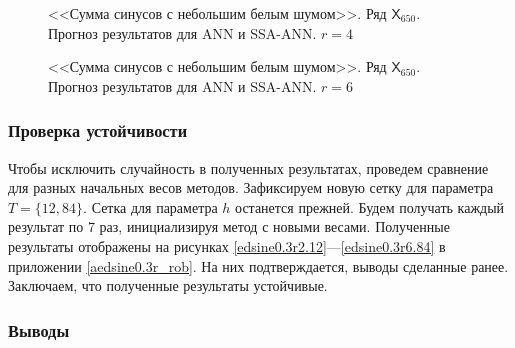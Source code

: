 \documentclass[specialist,
               substylefile = spbu.rtx,
               subf,href,colorlinks=true, 12p]{disser}
\newcommand{\multiref}[2]{\ref{#1}---\ref{#2}}
\begin{document}
\begin{figure}[H]
	\captionsetup{justification=centering}
	\caption{<<Сумма синусов с небольшим белым шумом>>. Ряд $\mathsf{X}_{650}$. Прогноз результатов для ANN и SSA-ANN. $r = 4$}
	\label{edsin0.3r_r4_res_ann}
\end{figure}

\begin{figure}[H]
	\captionsetup{justification=centering}
	\caption{<<Сумма синусов с небольшим белым шумом>>. Ряд $\mathsf{X}_{650}$. Прогноз результатов для ANN и SSA-ANN. $r = 6$}
	\label{edsin0.3r_r6_res_ann}
\end{figure}

\subsubsection{Проверка устойчивости}
\label{edsine0.3r_rob}
Чтобы исключить случайность в полученных результатах, проведем сравнение для разных начальных весов методов. Зафиксируем новую сетку для параметра $T = \{12, 84\}$. Сетка для параметра $h$ останется прежней. Будем получать каждый результат по 7 раз, инициализируя метод с новыми весами. Полученные результаты отображены на рисунках \multiref{edsine0.3r2.12}{edsine0.3r6.84} в приложении \ref{aedsine0.3r_rob}. На них подтверждается, выводы сделанные ранее. Заключаем, что полученные результаты устойчивые.

\subsubsection{Выводы}
\end{document}
